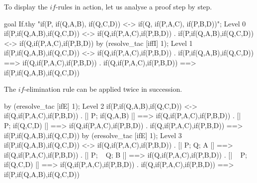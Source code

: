 To display the $if$-rules in action, let us analyse a proof step by step.
\begin{ttbox}
goal If.thy
    "if(P, if(Q,A,B), if(Q,C,D)) <-> if(Q, if(P,A,C), if(P,B,D))";
{\out Level 0}
{\out if(P,if(Q,A,B),if(Q,C,D)) <-> if(Q,if(P,A,C),if(P,B,D))}
{. if(P,if(Q,A,B),if(Q,C,D)) <-> if(Q,if(P,A,C),if(P,B,D))}
\ttbreak
by (resolve_tac [iffI] 1);
{\out Level 1}
{\out if(P,if(Q,A,B),if(Q,C,D)) <-> if(Q,if(P,A,C),if(P,B,D))}
{. if(P,if(Q,A,B),if(Q,C,D)) ==> if(Q,if(P,A,C),if(P,B,D))}
{. if(Q,if(P,A,C),if(P,B,D)) ==> if(P,if(Q,A,B),if(Q,C,D))}
\end{ttbox}
The $if$-elimination rule can be applied twice in succession.
\begin{ttbox}
by (eresolve_tac [ifE] 1);
{\out Level 2}
{\out if(P,if(Q,A,B),if(Q,C,D)) <-> if(Q,if(P,A,C),if(P,B,D))}
{. [| P; if(Q,A,B) |] ==> if(Q,if(P,A,C),if(P,B,D))}
{. [| ~ P; if(Q,C,D) |] ==> if(Q,if(P,A,C),if(P,B,D))}
{. if(Q,if(P,A,C),if(P,B,D)) ==> if(P,if(Q,A,B),if(Q,C,D))}
\ttbreak
by (eresolve_tac [ifE] 1);
{\out Level 3}
{\out if(P,if(Q,A,B),if(Q,C,D)) <-> if(Q,if(P,A,C),if(P,B,D))}
{. [| P; Q; A |] ==> if(Q,if(P,A,C),if(P,B,D))}
{. [| P; ~ Q; B |] ==> if(Q,if(P,A,C),if(P,B,D))}
{. [| ~ P; if(Q,C,D) |] ==> if(Q,if(P,A,C),if(P,B,D))}
{. if(Q,if(P,A,C),if(P,B,D)) ==> if(P,if(Q,A,B),if(Q,C,D))}
\end{ttbox}

